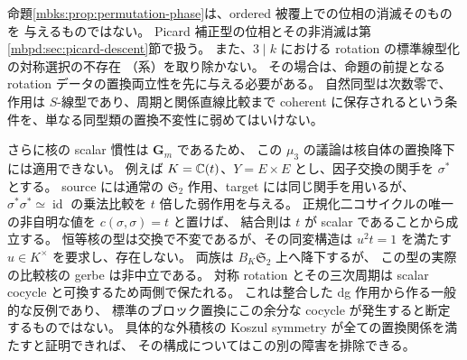 \begin{remark}[置換位相の消滅が使える範囲]
\label{mbks:rem:permutation-scope}
命題\ref{mbks:prop:permutation-phase}は、ordered 被覆上での位相の消滅そのものを
与えるものではない。
Picard 補正型の位相とその非消滅は第\ref{mbpd:sec:picard-descent}節で扱う。
また、$3\mid k$ における rotation の標準線型化の対称選択の不存在
（系）を取り除かない。
その場合は、命題の前提となる rotation データの置換両立性を先に与える必要がある。
自然同型は次数零で、作用は $S$-線型であり、周期と関係直線比較まで
coherent に保存されるという条件を、単なる同型類の置換不変性に弱めてはいけない。

さらに核の scalar 慣性は $\mathbf G_m$ であるため、
この $\mu_3$ の議論は核自体の置換降下には適用できない。
例えば $K=\mathbb C(t)$、$Y=E\times E$ とし、因子交換の関手を $\sigma^*$ とする。
source には通常の $\mathfrak S_2$ 作用、target には同じ関手を用いるが、
$\sigma^*\sigma^*\simeq\operatorname{id}$ の乗法比較を $t$ 倍した弱作用を与える。
正規化二コサイクルの唯一の非自明な値を $c(\sigma,\sigma)=t$ と置けば、
結合則は $t$ が scalar であることから成立する。
恒等核の型は交換で不変であるが、その同変構造は
$u^2t=1$ を満たす $u\in K^\times$ を要求し、存在しない。
両族は $B_K\mathfrak S_2$ 上へ降下するが、
この型の実際の比較核の gerbe は非中立である。
対称 rotation とその三次周期は scalar cocycle と可換するため両側で保たれる。
これは整合した dg 作用から作る一般的な反例であり、
標準のブロック置換にこの余分な cocycle が発生すると断定するものではない。
具体的な外積核の Koszul symmetry が全ての置換関係を満たすと証明できれば、
その構成についてはこの別の障害を排除できる。
\end{remark}
